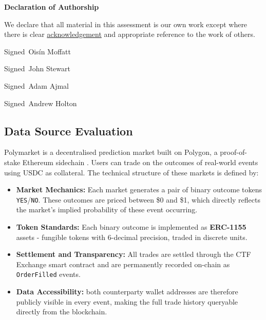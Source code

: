 \documentclass[11pt]{article}
\newcommand{\inputsection}[1]{}
\begin{document}
\vspace{1.0cm}

\begin{mdframed}[linewidth=0.6pt]
{\bfseries Declaration of Authorship}

We declare that all material in this assessment is our own work except
where there is clear \underline{acknowledgement} and appropriate reference
to the work of others.

\vspace{0.6cm}
Signed\dotfill\ Oisín Moffatt\dotfill\par
\vspace{0.2cm}
Signed\dotfill\ John Stewart\dotfill\par
\vspace{0.2cm}
Signed\dotfill\ Adam Ajmal\dotfill\par
\vspace{0.2cm}
Signed\dotfill\ Andrew Holton \dotfill\par
\end{mdframed}


\newpage
\setcounter{tocdepth}{2}
\tableofcontents
\newpage





\subsection{Data Source Evaluation}
\label{sec:data_sources}

Polymarket is a decentralised prediction market built on Polygon,
a proof-of-stake Ethereum sidechain \cite{polymarket_docs}. Users can
trade on the outcomes of real-world events using USDC as
collateral. The technical structure of these markets is defined by:

\begin{itemize}
    \item \textbf{Market Mechanics:} Each market generates a pair of binary outcome tokens \texttt{YES}/\texttt{NO}. These outcomes are priced between \$0 and \$1, which  directly reflects the market's implied probability of these event occurring.
    \item \textbf{Token Standards:} Each binary outcome is implemented as \textbf{ERC-1155} assets - fungible tokens with 6-decimal precision, traded in discrete units. 
    \item \textbf{Settlement and Transparency:} All trades are settled through the CTF Exchange smart contract and are permanently recorded on-chain as \texttt{OrderFilled} events.
    \item \textbf{Data Accessibility:} both counterparty wallet addresses are therefore
    publicly visible in every event, making the full trade history queryable directly from the blockchain.
\end{itemize}
\end{document}
